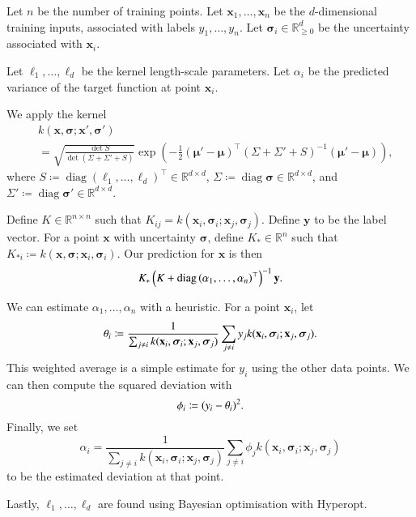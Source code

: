 \documentclass[11pt]{report}
\newcommand{\bx}{\mathbf{x}}
\newcommand{\by}{\mathbf{y}}
\newcommand{\bsigma}{\bm{\sigma}}
\newcommand{\bbR}{\mathbb{R}}
\DeclareMathOperator{\diag}{diag}
\begin{document}
Let $n$ be the number of training points. Let $\bx_1, \dots, \bx_n$ be the $d$-dimensional training inputs, associated with labels $y_1, \dots, y_n$. Let $\bsigma_i \in \bbR^d_{\geq0}$ be the uncertainty associated with $\bx_i$.

Let $\ell_1, \dots, \ell_d$ be the kernel length-scale parameters. Let $\alpha_i$ be the predicted variance of the target function at point $\bx_i$.

We apply the kernel \begin{align*}
    &k(\bx, \bsigma; \bx', \bsigma') \\
    &= \sqrt{\frac{\det S}{\det\left(\Sigma + \Sigma' + S\right)}} \exp\left(-\frac{1}{2}\left(\bm{\mu}' - \bm{\mu}\right)^\top \left( \Sigma + \Sigma' + S\right)^{-1}\left(\bm{\mu}' - \bm{\mu}\right)\right) \text{,}
\end{align*} where $S \coloneqq \diag(\ell_1, \dots, \ell_d)^\top \in \bbR^{d\times d}$, $\Sigma \coloneqq \diag\bsigma \in \bbR^{d\times d}$, and $\Sigma' \coloneqq \diag\bsigma' \in \bbR^{d\times d}$.

Define $K \in \bbR^{n\times n}$ such that $K_{ij} = k(\bx_i, \bsigma_i; \bx_j, \bsigma_j)$. Define $\by$ to be the label vector. For a point $\bx$ with uncertainty $\bsigma$, define $K_* \in \bbR^n$ such that $K_{*i} \coloneqq k(\bx, \bsigma; \bx_i, \bsigma_i)$. Our prediction for $\bx$ is then \[
    K_*\left(K + \diag\left(\alpha_1, \dots, \alpha_n\right)^\top\right)^{-1}\by\text.
\]

We can estimate $\alpha_1, \dots, \alpha_n$ with a heuristic. For a point $\bx_i$, let \[
    \theta_i \coloneqq \frac{1}{\sum_{j \neq i}k(\bx_i, \bsigma_i; \bx_j, \bsigma_j)} \sum_{j \neq i}y_jk(\bx_i, \bsigma_i; \bx_j, \bsigma_j) \text.
\] This weighted average is a simple estimate for $y_i$ using the other data points. We can then compute the squared deviation with \[
    \phi_i \coloneqq (y_i - \theta_i)^2 \text.
\] Finally, we set \[
    \alpha_i = \frac{1}{\sum_{j \neq i}k(\bx_i, \bsigma_i; \bx_j, \bsigma_j)} \sum_{j \neq i}\phi_jk(\bx_i, \bsigma_i; \bx_j, \bsigma_j)
\] to be the estimated deviation at that point.

Lastly, $\ell_1, \dots, \ell_d$ are found using Bayesian optimisation with Hyperopt.
\end{document}
